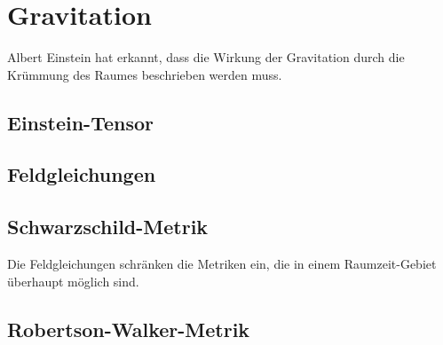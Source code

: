 %
%
%
\section{Gravitation%
\label{skript:kruemmung:sectipn:gravitation}}
Albert Einstein hat erkannt, dass die Wirkung der Gravitation 
durch die Krümmung des Raumes beschrieben werden muss.

\subsection{Einstein-Tensor}

\subsection{Feldgleichungen}

\subsection{Schwarzschild-Metrik}
Die Feldgleichungen schränken die Metriken ein, die in einem Raumzeit-Gebiet
überhaupt möglich sind.

\subsection{Robertson-Walker-Metrik}


